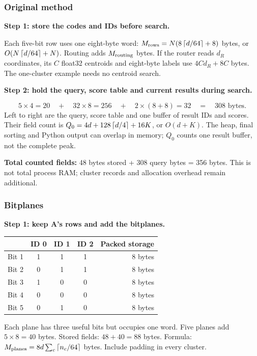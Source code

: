 \subsubsection{Original method}
\textbf{Step 1: store the codes and IDs before search.}\par
\begin{center}
\end{center}
Each five-bit row uses one eight-byte word: $M_{\rm rows}=N(8\left\lceil d/64\right\rceil+8)$ bytes, or $O(N\left\lceil d/64\right\rceil+N)$. Routing adds $M_{\rm routing}$ bytes. If the router reads $d_R$ coordinates, its $C$ float32 centroids and eight-byte labels use $4Cd_R+8C$ bytes. The one-cluster example needs no centroid search.

\textbf{Step 2: hold the query, score table and current results during search.}\par
\[
 \boxed{5\times4=20}\quad+\quad
 \boxed{32\times8=256}\quad+\quad
 \boxed{2\times(8+8)=32}\quad=\quad308\text{ bytes}.
\]
Left to right are the query, score table and one buffer of result IDs and scores. Their field count is $Q_0=4d+128\left\lceil d/4\right\rceil+16K$, or $O(d+K)$. The heap, final sorting and Python output can overlap in memory; $Q_0$ counts one result buffer, not the complete peak.

\textbf{Total counted fields:} 48 bytes stored + 308 query bytes = 356 bytes. This is not total process RAM; cluster records and allocation overhead remain additional.

\subsubsection{Bitplanes}
\textbf{Step 1: keep A's rows and add the bitplanes.}\par
\begin{center}\small
\begin{tabular}{c|ccc|r}
 & ID 0 & ID 1 & ID 2 & Packed storage\\\hline
Bit 1 &1&1&1&8 bytes\\
Bit 2 &0&1&1&8 bytes\\
Bit 3 &1&0&0&8 bytes\\
Bit 4 &0&0&0&8 bytes\\
Bit 5 &0&1&0&8 bytes
\end{tabular}\normalsize
\end{center}
Each plane has three useful bits but occupies one word. Five planes add $5\times8=40$ bytes. Stored fields: $48+40=88$ bytes. Formula: $M_{\rm planes}=8d\sum_c\left\lceil n_c/64\right\rceil$ bytes. Include padding in every cluster.


